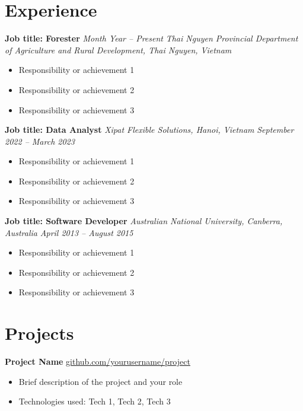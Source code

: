 \documentclass[a4paper,12pt]{article}
\begin{document}
\section*{Experience}
\noindent
\textbf{Job title: Forester}     \hfill \textit{Month Year -- Present} \newline
\textit{Thai Nguyen Provincial Department of Agriculture and Rural Development, Thai Nguyen, Vietnam} \newline
\begin{itemize}
    \item Responsibility or achievement 1
    \item Responsibility or achievement 2
    \item Responsibility or achievement 3
\end{itemize}
\vspace{1em} %
\noindent
\textbf{Job title: Data Analyst} \newline
\textit{Xipat Flexible Solutions, Hanoi, Vietnam} \newline
\textit{September 2022 -- March 2023} \newline
\begin{itemize}
    \item Responsibility or achievement 1
    \item Responsibility or achievement 2
    \item Responsibility or achievement 3
\end{itemize}

\vspace{1em} %
\noindent
\textbf{Job title: Software Developer} \newline
\textit{{Australian National University, Canberra, Australia}} \newline
\textit{April 2013 -- August 2015} \newline
\begin{itemize}
    \item Responsibility or achievement 1
    \item Responsibility or achievement 2
    \item Responsibility or achievement 3
\end{itemize}


\section*{Projects}
\noindent
\textbf{Project Name} \hfill \href{https://github.com/yourusername/project}{github.com/yourusername/project} \newline
\begin{itemize}
    \item Brief description of the project and your role
    \item Technologies used: Tech 1, Tech 2, Tech 3
\end{itemize}
\end{document}
